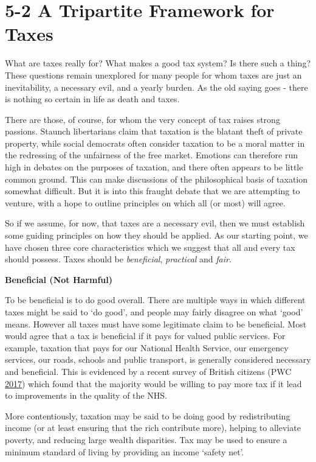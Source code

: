 \documentclass[]{tufte-handout}
\begin{document}
\hypertarget{a-tripartite-framework-for-taxes}{%
\section{5-2 A Tripartite Framework for
Taxes}\label{a-tripartite-framework-for-taxes}}

What are taxes really for? What makes a good tax system? Is there such a
thing? These questions remain unexplored for many people for whom taxes
are just an inevitability, a necessary evil, and a yearly burden. As the
old saying goes - there is nothing so certain in life as death and
taxes.

There are those, of course, for whom the very concept of tax raises
strong passions. Staunch libertarians claim that taxation is the blatant
theft of private property, while social democrats often consider
taxation to be a moral matter in the redressing of the unfairness of the
free market. Emotions can therefore run high in debates on the purposes
of taxation, and there often appears to be little common ground. This
can make discussions of the philosophical basis of taxation somewhat
difficult. But it is into this fraught debate that we are attempting to
venture, with a hope to outline principles on which all (or most) will
agree.

So if we assume, for now, that taxes are a necessary evil, then we must
establish some guiding principles on how they should be applied. As our
starting point, we have chosen three core characteristics which we
suggest that all and every tax should possess. Taxes should be
\emph{beneficial}, \emph{practical} and \emph{fair}.

\textbf{Beneficial (Not Harmful)}

To be beneficial is to do good overall. There are multiple ways in which
different taxes might be said to `do good', and people may fairly
disagree on what `good' means. However all taxes must have some
legitimate claim to be beneficial. Most would agree that a tax is
beneficial if it pays for valued public services. For example, taxation
that pays for our National Health Service, our emergency services, our
roads, schools and public transport, is generally considered necessary
and beneficial. This is evidenced by a recent survey of British citizens
(PWC \protect\hyperlink{ref-PWC2017}{2017}) which found that the
majority would be willing to pay more tax if it lead to improvements in
the quality of the NHS.

More contentiously, taxation may be said to be doing good by
redistributing income (or at least ensuring that the rich contribute
more), helping to alleviate poverty, and reducing large wealth
disparities. Tax may be used to ensure a minimum standard of living by
providing an income `safety net'.
\end{document}
